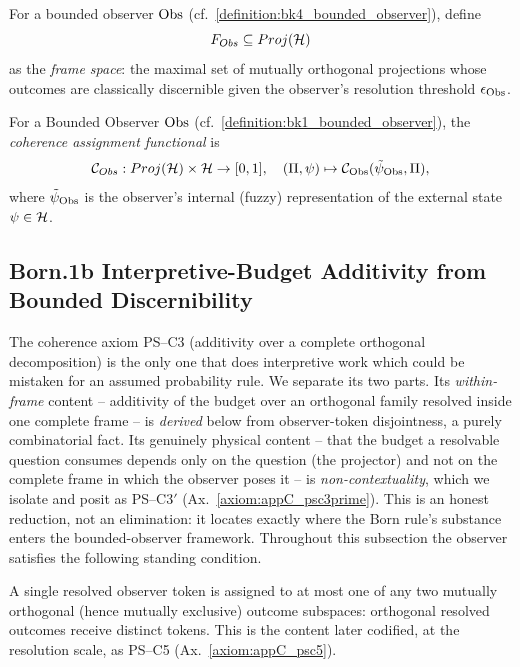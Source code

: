 \begin{definition}
\label{definition:appC_frame_space}
For a bounded observer $\mathrm{Obs}$ (cf.~\ref{definition:bk4_bounded_observer}), define
\[
F_{Obs} \subseteq Proj(\mathcal{H})
\]
as the \emph{frame space}: the maximal set of mutually orthogonal projections
whose outcomes are classically discernible given the observer’s resolution threshold
$\epsilon_{\mathrm{Obs}}$.
\end{definition}

\begin{definition}
\label{definition:appC_coherence_functional}
For a Bounded Observer $\mathrm{Obs}$ (cf.~\ref{definition:bk1_bounded_observer}), the \emph{coherence assignment functional} is
\[
\mathcal{C}_{Obs}: Proj(\mathcal{H}) \times \mathcal{H} \to [0,1], \quad
(\Pi, \psi) \mapsto \mathcal{C}_{\mathrm{Obs}}(\tilde\psi_{\mathrm{Obs}}, \Pi),
\]
where $\tilde\psi_{\mathrm{Obs}}$ is the observer’s internal (fuzzy) representation
of the external state $\psi \in \mathcal{H}$.
\end{definition}

\subsection{Born.1b Interpretive-Budget Additivity from Bounded Discernibility}
\label{subsec:appC_born_additivity_derivation}
The coherence axiom PS--C3 (additivity over a complete orthogonal decomposition) is
the only one that does interpretive work which could be mistaken for an assumed
probability rule. We separate its two parts. Its \emph{within-frame} content --
additivity of the budget over an orthogonal family resolved inside one complete
frame -- is \emph{derived} below from observer-token disjointness, a purely
combinatorial fact. Its genuinely physical content -- that the budget a resolvable
question consumes depends only on the question (the projector) and not on the
complete frame in which the observer poses it -- is \emph{non-contextuality}, which
we isolate and posit as PS--C3$'$ (Ax.~\ref{axiom:appC_psc3prime}). This is an honest
reduction, not an elimination: it locates exactly where the Born rule's substance
enters the bounded-observer framework. Throughout this subsection the observer
satisfies the following standing condition.

\begin{assumption}
\label{assumption:appC_bounded_discernibility}
A single resolved observer token is assigned to at most one of any two mutually
orthogonal (hence mutually exclusive) outcome subspaces: orthogonal resolved outcomes
receive distinct tokens. This is the content later codified, at the resolution scale,
as PS--C5 (Ax.~\ref{axiom:appC_psc5}).
\end{assumption}

